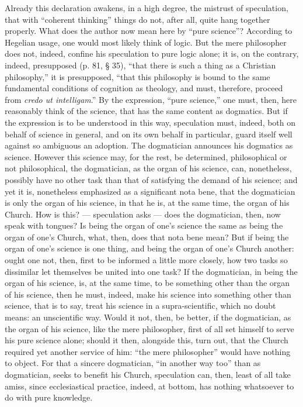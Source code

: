 \documentclass[12pt]{book}
\begin{document}
Already this declaration awakens, in a high degree, the mistrust of speculation, that with ``coherent thinking'' things do not, after all, quite hang together properly. What does the author now mean here by ``pure science''? According to Hegelian usage, one would most likely think of logic. But the mere philosopher does not, indeed, confine his speculation to pure logic alone; it is, on the contrary, indeed, presupposed (p. 81, § 35), ``that there is such a thing as a Christian philosophy,'' it is presupposed, ``that this philosophy is bound to the same fundamental conditions of cognition as theology, and must, therefore, proceed from \textit{credo ut intelligam}.'' By the expression, ``pure science,'' one must, then, here reasonably think of the science, that has the same content as dogmatics. But if the expression is to be understood in this way, speculation must, indeed, both on behalf of science in general, and on its own behalf in particular, guard itself well against so ambiguous an adoption. The dogmatician announces his dogmatics as science. However this science may, for the rest, be determined, philosophical or not philosophical, the dogmatician, as the organ of his science, can, nonetheless, possibly have no other task than that of satisfying the demand of his science; and yet it is, nonetheless
emphasized as a significant nota bene, that the dogmatician is only the organ of his science, in that he is, at the same time, the organ of his Church. How is this? --- speculation asks --- does the dogmatician, then, now speak with tongues? Is being the organ of one's science the same as being the organ of one's Church, what, then, does that nota bene mean? But if being the organ of one's science is one thing, and being the organ of one's Church another: ought one not, then, first to be informed a little more closely, how two tasks so dissimilar let themselves be united into one task? If the dogmatician, in being the organ of his science, is, at the same time, to be something other than the organ of his science, then he must, indeed, make his science into something other than science, that is to say, treat his science in a supra-scientific, which no doubt means: an unscientific way. Would it not, then, be better, if the dogmatician, as the organ of his science, like the mere philosopher, first of all set himself to serve his pure science alone; should it then, alongside this, turn out, that the Church required yet another service of him: ``the mere philosopher'' would have nothing to object. For that a sincere dogmatician, ``in another way too'' than as dogmatician, seeks to benefit his Church, speculation can, then, least of all take amiss, since ecclesiastical practice, indeed, at bottom, has nothing whatsoever to do with pure knowledge.
\end{document}
